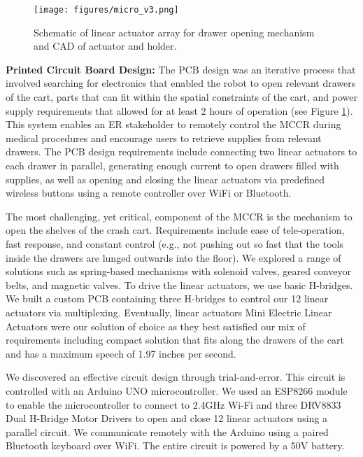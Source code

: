 \begin{figure}[t] 
	\centering 
	\texttt{[image: figures/micro\_v3.png]} 
	\caption{Schematic of linear actuator array for drawer opening mechanism and CAD of actuator and holder.}%
	\label{fig:pcb} 
    \vspace{-5pt}
\end{figure}


\textbf{Printed Circuit Board Design:} The PCB design was an iterative process that involved searching for electronics that enabled the robot to open relevant drawers of the cart, parts that can fit within the spatial constraints of the cart, and power supply requirements that allowed for at least 2 hours of operation (see Figure \ref{fig:pcb}).
This system enables an ER stakeholder to remotely control the MCCR during medical procedures and encourage users to retrieve supplies from relevant drawers. 
The PCB design requirements include connecting two linear actuators to each drawer in parallel, generating enough current to open drawers filled with supplies, as well as opening and closing the linear actuators via predefined wireless buttons using a remote controller over WiFi or Bluetooth.

The most challenging, yet critical, component of the MCCR is the mechanism to open the shelves of the crash cart. 
Requirements include ease of tele-operation, fast response, and constant control (e.g., not pushing out so fast that the tools inside the drawers are lunged outwards into the floor). 
We explored a range of solutions such as spring-based mechanisms with solenoid valves, geared conveyor belts, and magnetic valves. 
To drive the linear actuators, we use basic H-bridges. 
We built a custom PCB containing three H-bridges to control our 12 linear actuators via multiplexing. 
Eventually, linear actuators Mini Electric Linear Actuators were our solution of choice as they best satisfied our mix of requirements including compact solution that fits along the drawers of the cart and has a maximum speech of 1.97 inches per second.

We discovered an effective circuit design through trial-and-error. 
This circuit is controlled with an Arduino UNO microcontroller.
We used an ESP8266 module to enable the microcontroller to connect to 2.4GHz Wi-Fi and three DRV8833 Dual H-Bridge Motor Drivers to open and close 12 linear actuators using a parallel circuit.
We communicate remotely with the Arduino using a paired Bluetooth keyboard over WiFi.
The entire circuit is powered by a 50V battery. 

